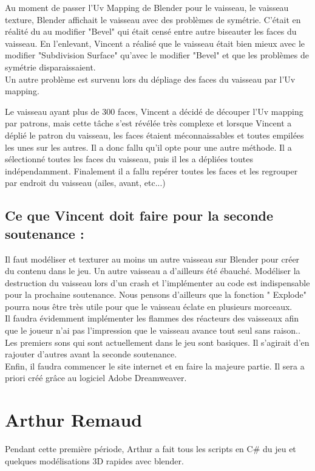 \documentclass[10pt, titlepage]{report}
\begin{document}
Au moment de passer l’Uv Mapping de Blender pour le vaisseau, le vaisseau texture, Blender affichait le vaisseau avec des problèmes de symétrie. C’était en réalité du au modifier "Bevel" qui était censé entre autre biseauter les faces du vaisseau. En l’enlevant, Vincent a réalisé que le vaisseau était bien mieux avec le modifier  "Subdivision Surface" qu’avec le modifier "Bevel" et que les problèmes de symétrie disparaissaient.\\

Un autre problème est survenu lors du dépliage des faces du vaisseau par l’Uv mapping.

Le vaisseau ayant plus de 300 faces, Vincent a décidé de découper l’Uv mapping par patrons, mais cette tâche s’est révélée très complexe et lorsque Vincent a déplié le patron du vaisseau, les faces étaient méconnaissables et toutes empilées les unes sur les autres. Il a donc fallu qu’il opte pour une autre méthode. Il a sélectionné toutes les faces du vaisseau, puis il les a dépliées toutes indépendamment. Finalement il a fallu repérer toutes les faces et les regrouper par endroit du vaisseau (ailes, avant, etc...)

\subsection{Ce que Vincent doit faire pour la seconde soutenance :}
Il faut modéliser et texturer au moins un autre vaisseau sur Blender pour créer du contenu dans le jeu. Un autre vaisseau a d’ailleurs été ébauché.
Modéliser la destruction du vaisseau lors d'un crash et l'implémenter au code est indispensable pour la prochaine soutenance. Nous pensons d’ailleurs que la fonction " Explode" pourra nous être très utile pour que le vaisseau éclate en plusieurs morceaux.\\

Il faudra évidemment implémenter les flammes des réacteurs des vaisseaux afin que le joueur n’ai pas l’impression que le vaisseau avance tout seul sans raison..
Les premiers sons qui sont actuellement dans le jeu sont basiques. Il s’agirait d’en rajouter d’autres avant la seconde soutenance.\\

Enfin, il faudra commencer le site internet et en faire la majeure partie. Il sera a priori créé grâce au logiciel Adobe Dreamweaver.


\section{Arthur Remaud}
Pendant cette première période, Arthur a fait tous les scripts en C\# du jeu et quelques modélisations 3D rapides avec blender.
\end{document}
